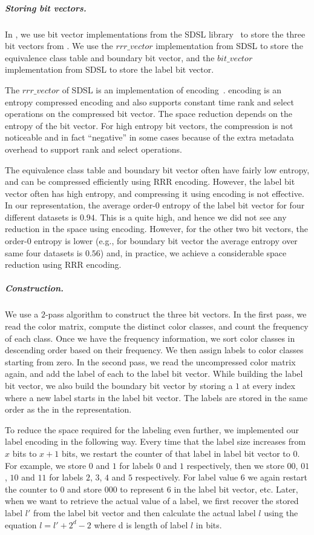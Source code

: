 \subparagraph{Storing bit vectors.} In \rainbowfish, we use bit vector implementations
from the SDSL library~\cite{sdsl} to store the three bit vectors from
. We use the $rrr\_vector$ implementation from SDSL to store
the equivalence class table and boundary bit vector, and the $bit\_vector$ implementation
from SDSL to store the label bit vector.

The $rrr\_vector$ of SDSL is an implementation of \rrr encoding~\cite{RamanRaRa02}. \rrr
encoding is an entropy compressed encoding and also supports constant time rank
and select operations on the compressed bit vector.  The space reduction depends
on the entropy of the bit vector. For high entropy bit vectors, the compression
is not noticeable and in fact ``negative'' in some cases because of the extra
metadata overhead to support rank and select operations.

The equivalence class table and boundary bit vector often have fairly low
entropy, and can be compressed efficiently using RRR encoding. However, the
label bit vector often has high entropy, and compressing it using \rrr encoding
is not effective. In our representation, the average order-$0$ entropy of the
label bit vector for four different datasets is $0.94$. This is a quite high,
and hence we did not see any reduction in the space using \rrr encoding.
However, for the other two bit vectors, the order-$0$ entropy is lower (e.g.,
for boundary bit vector the average entropy over same four datasets is $0.56$)
and, in practice, we achieve a considerable space reduction using RRR encoding.

\subparagraph{Construction.} We use a $2$-pass algorithm to construct the three bit vectors. In the first pass, we read the color matrix, compute the distinct color classes, and count the frequency of each class. Once we have the frequency information, we sort color
classes in descending order based on their frequency. We then assign labels to
color classes starting from zero. In the second pass, we read the uncompressed
color matrix again, and add the label of each \kmer to the label bit vector.
While building the label bit vector, we also build the boundary bit vector by
storing a $1$ at every index where a new label starts in the label bit vector.
The labels are stored in the same order as the \kmers in the \boss
representation.

To reduce the space required for the labeling even further, we implemented our label
encoding in the following way. Every time that the label size increases from $x$
bits to $x+1$ bits, we restart the counter of that label in label bit vector to
$0$. For example, we store $0$ and $1$ for labels $0$ and $1$ respectively,
then we store $00$, $01$, $10$ and $11$ for labels $2$, $3$, $4$ and $5$
respectively. For label value $6$ we again restart the counter to $0$ and store
$000$ to represent $6$ in the label bit vector, etc. Later, when we want to retrieve
the actual value of a label, we first recover the stored label $l'$ from the label
bit vector and then calculate the actual label $l$ using the equation $l = l'
+ 2^{d}-2$ where d is length of label $l$ in bits.

